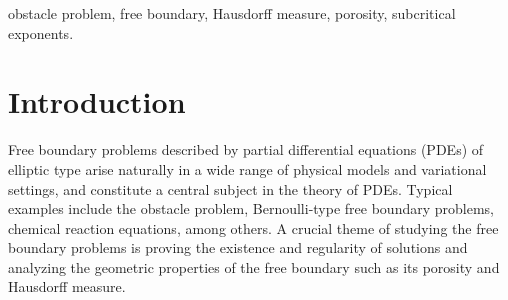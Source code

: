 \documentclass[onecolumn]{autart}
\begin{document}
\begin{frontmatter}
\vspace*{-12pt}
\begin{keyword}                            %
obstacle problem, free boundary,   Hausdorff measure, porosity, subcritical exponents.
\end{keyword}                              %
\end{frontmatter}
\endNoHyper



\section{Introduction}\label{Sec.1}
Free boundary problems described by partial differential equations (PDEs) of elliptic type arise naturally in a wide range of physical models and variational settings, and constitute a central subject in the theory of PDEs. Typical examples include the obstacle problem, Bernoulli-type free boundary problems, chemical reaction  equations,  among others. A crucial theme of studying the free boundary problems is proving the existence and regularity of solutions and analyzing the geometric properties of the free boundary such as its  porosity and Hausdorff measure.
\end{document}
